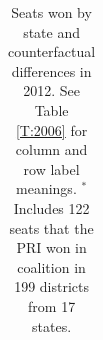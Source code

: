 \documentclass[letter,12pt]{article}
\begin{document}
\begin{table}
\begin{center}
\begin{tabular}{rrrr|rrr|rrr|rrr}
\end{tabular}
\caption{Seats won by state and counterfactual differences in 2012. See Table \ref{T:2006} for column and row label meanings. $^*$Includes 122 seats that the PRI won in coalition in 199 districts from 17 states.}\label{T:2012}
\end{center}
\end{table}
\end{document}
